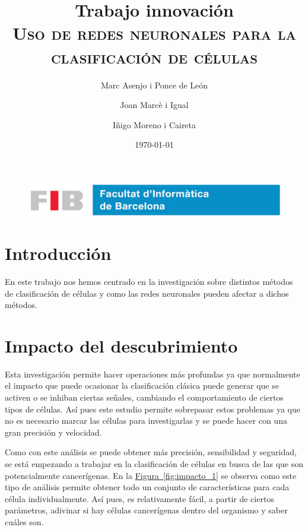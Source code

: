 \documentclass[a4paper, 12pt, UTF8]{article}
\title{
	\Huge
	\textbf{Trabajo innovación} \\
	\scshape Uso de redes neuronales para la clasificación de células
	}
\author{
	Marc Asenjo i Ponce de León \and
	Joan Marcè i Igual \and
	Iñigo Moreno i Caireta
	}
\date{\today}
\begin{document}
\maketitle

\begin{figure}
	\centering
	\includegraphics[width=\linewidth]{./simple_FIB}
\end{figure}

\newpage
\tableofcontents

\newpage

\section{Introducción}

En este trabajo nos hemos centrado en la investigación sobre distintos métodos de clasificación de células y como las redes neuronales pueden afectar a dichos métodos.

\section{Impacto del descubrimiento}

Esta investigación permite hacer operaciones más profundas ya que normalmente el impacto que puede ocasionar la clasificación clásica puede generar que se activen o se inhiban ciertas señales, cambiando el comportamiento de ciertos tipos de células. Así pues este estudio permite sobrepasar estos problemas ya que no es necesario marcar las células para investigarlas y se puede hacer con una gran precisión y velocidad.

Como con este análisis se puede obtener más precisión, sensibilidad y seguridad, se está empezando a trabajar en la clasificación de células en busca de las que son potencialmente cancerígenas. En la \hyperref[fig:impacto_1]{Figura~\ref{fig:impacto_1}} se observa como este tipo de análisis permite obtener todo un conjunto de características para cada célula individualmente. 
Así pues, es relativamente fácil, a partir de ciertos parámetros, adivinar si hay células cancerígenas dentro del organismo y saber cuáles son.
\end{document}
